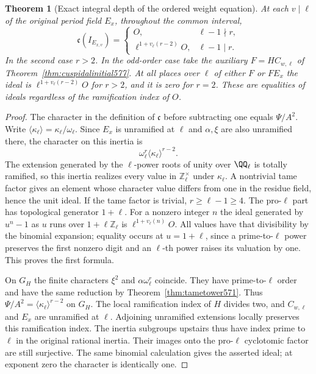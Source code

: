 \documentclass[a4paper,11pt]{article}
\newtheorem{theorem}[proposition]{Theorem}
\theoremstyle{definition}
\theoremstyle{remark}
\newcommand{\ZZ}{\mathbb Z}\newcommand{\ord}{\operatorname{ord}}
\numberwithin{equation}{section}
\begin{document}
\begin{theorem}[Exact integral depth of the ordered weight equation]
\leavevmode\label{thm:cubedepth584}
At each \(v\mid\ell\) of the original period field \(E_x\),
throughout the common interval,
\[
 \mathfrak c(I_{E_{x,v}})=
 \begin{cases}
    O, &\ell-1\nmid r,\\
    \ell^{1+v_\ell(r-2)}O, &\ell-1\mid r .
 \end{cases}
\]
In the second case \(r>2\). In the odd-order case take the
auxiliary \(F=H C_{w,\ell}\) of Theorem~\ref{thm:cuspidalinitial577}.
At all places over \(\ell\) of either \(F\) or \(FE_x\) the ideal
is \(\ell^{1+v_\ell(r-2)}O\) for \(r>2\), and it is zero for
\(r=2\). These are equalities of ideals regardless of the
ramification index of \(O\).
\end{theorem}
\begin{proof}
The character in the definition of \(\mathfrak c\) before
subtracting one equals \(\Psi/A^2\).
Write \(\langle\kappa_\ell\rangle=\kappa_\ell/\omega_\ell\).
Since \(E_x\) is unramified at \(\ell\) and \(\alpha,\xi\)
are also unramified there, the character on this inertia is
\[
             \omega_\ell^r\langle\kappa_\ell\rangle^{r-2}.
\]
The extension generated by the \(\ell\)-power roots of unity over \(\QQ_\ell\) is totally
ramified, so this inertia realizes every value in
\(\ZZ_\ell^\times\) under \(\kappa_\ell\). A nontrivial tame
factor gives an element whose character value differs from one
in the residue field, hence the unit
ideal. If the tame factor is trivial, \(r\ge\ell-1\ge4\).
The pro-\(\ell\) part has topological generator \(1+\ell\).
For a nonzero integer \(n\) the ideal generated by \(u^n-1\)
as \(u\) runs over \(1+\ell\ZZ_\ell\) is
\(\ell^{1+v_\ell(n)}O\). All values have that divisibility
by the binomial expansion; equality occurs at \(u=1+\ell\),
since a prime-to-\(\ell\) power preserves the first nonzero
digit and an \(\ell\)-th power raises its valuation by one.
This proves the first formula.

On \(G_H\) the finite characters \(\xi^2\) and
\(\alpha\omega_\ell^r\) coincide. They have prime-to-\(\ell\)
order and have the same reduction by Theorem~\ref{thm:tametower571}.
Thus \(\Psi/A^2=\langle\kappa_\ell\rangle^{r-2}\) on \(G_H\).
The local ramification index of \(H\) divides two, and
\(C_{w,\ell}\) and \(E_x\) are unramified at \(\ell\).
Adjoining unramified extensions locally preserves this
ramification index. The inertia subgroups upstairs thus
have index prime to \(\ell\) in the original rational
inertia. Their images onto the pro-\(\ell\) cyclotomic
factor are still surjective. The same binomial calculation
gives the asserted ideal; at exponent zero the character is
identically one.
\end{proof}
\end{document}
